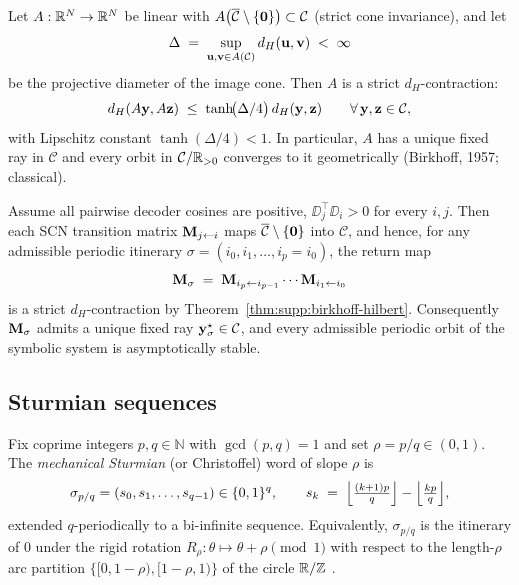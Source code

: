 \begin{theorem}\label{thm:supp:birkhoff-hilbert}
Let $A:\mathbb{R}^{N}\to\mathbb{R}^{N}$ be linear with $A\bigl(\overline{\mathcal{C}}\setminus\{\mathbf{0}\}\bigr)\subset\mathcal{C}$ (strict cone invariance), and let
\[
\Delta \;=\; \sup_{\mathbf{u},\mathbf{v}\in A(\mathcal{C})} d_H(\mathbf{u},\mathbf{v}) \;<\;\infty
\]
be the projective diameter of the image cone. Then $A$ is a strict $d_H$-contraction:
\[
d_H(A\mathbf{y},A\mathbf{z}) \;\le\; \tanh\!\bigl(\Delta/4\bigr)\, d_H(\mathbf{y},\mathbf{z}) \qquad \forall\,\mathbf{y},\mathbf{z}\in\mathcal{C},
\]
with Lipschitz constant $\tanh(\Delta/4)<1$. In particular, $A$ has a unique fixed ray in $\mathcal{C}$ and every orbit in $\mathcal{C}/\mathbb{R}_{>0}$ converges to it geometrically (Birkhoff, 1957; classical).
\end{theorem}

\begin{corollary}\label{cor:supp:scn-birkhoff}
Assume all pairwise decoder cosines are positive, $\DD_j^\top\DD_i>0$ for every $i,j$. Then each SCN transition matrix $\mathbf{M}_{j\leftarrow i}$ maps $\overline{\mathcal{C}}\setminus\{\mathbf{0}\}$ into $\mathcal{C}$, and hence, for any admissible periodic itinerary $\sigma=(i_0,i_1,\dots,i_p=i_0)$, the return map
\[
\mathbf{M}_\sigma \;=\; \mathbf{M}_{i_p\leftarrow i_{p-1}}\cdots\mathbf{M}_{i_1\leftarrow i_0}
\]
is a strict $d_H$-contraction by Theorem~\ref{thm:supp:birkhoff-hilbert}. Consequently $\mathbf{M}_\sigma$ admits a unique fixed ray $\mathbf{y}_\sigma^\star\in\mathcal{C}$, and every admissible periodic orbit of the symbolic system is asymptotically stable.
\end{corollary}

\subsection{Sturmian sequences}\label{sec:supp:sturmian}

\begin{definition}\label{def:supp:sturmian}
Fix coprime integers $p,q\in\mathbb{N}$ with $\gcd(p,q)=1$ and set $\rho=p/q\in(0,1)$. The \emph{mechanical Sturmian} (or Christoffel) word of slope $\rho$ is
\[
  \sigma_{p/q}=(s_0,s_1,\ldots,s_{q-1})\in\{0,1\}^q,\qquad s_k \;=\; \Bigl\lfloor \tfrac{(k+1)p}{q}\Bigr\rfloor-\Bigl\lfloor \tfrac{kp}{q}\Bigr\rfloor,
\]
extended $q$-periodically to a bi-infinite sequence. Equivalently, $\sigma_{p/q}$ is the itinerary of $0$ under the rigid rotation $R_\rho:\theta\mapsto\theta+\rho\pmod{1}$ with respect to the length-$\rho$ arc partition $\{[0,1-\rho),[1-\rho,1)\}$ of the circle $\mathbb{R}/\mathbb{Z}$ \citep{morse1938symbolic,lothaire2002algebraic}.
\end{definition}

